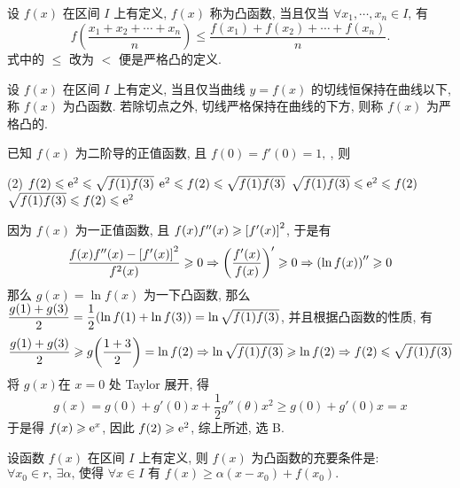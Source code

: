 \begin{definition}[凸函数 C]
    设 $ f(x) $ 在区间 $ I $ 上有定义, $f(x) $ 称为凸函数, 当且仅当 $ \forall x_{1}, \cdots, x_{n} \in   I$, 有
    $$f\left(\frac{x_{1}+x_{2}+\cdots+x_{n}}{n}\right) \leqslant \frac{f\left(x_{1}\right)+f\left(x_{2}\right)+\cdots+f\left(x_{n}\right)}{n} .$$
    式中的 $\leqslant$ 改为 $<$ 便是严格凸的定义.
\end{definition}

\begin{definition}[凸函数 D]
    设 $ f(x) $ 在区间 $ I $ 上有定义, 当且仅当曲线 $ y=f(x) $ 的切线恒保持在曲线以下, 称 $ f(x) $ 为凸函数. 若除切点之外, 切线严格保持在曲线的下方, 则称 $ f(x) $ 为严格凸的.
\end{definition}

\begin{example}
    已知 $f(x)$ 为二阶导的正值函数, 且 $f(0)=f'(0)=1,~$, 则
    \begin{tasks}(2)
        \task $f(2)\leqslant \mathrm{e}^{2}\leqslant \sqrt{f(1)f(3)}$
        \task $\mathrm{e}^{2}\leqslant f(2)\leqslant \sqrt{f(1)f(3)}$
        \task $\sqrt{f(1)f(3)}\leqslant \mathrm{e}^{2}\leqslant f(2)$
        \task $\sqrt{f(1)f(3)}\leqslant f(2)\leqslant \mathrm{e}^{2}$
    \end{tasks}
\end{example}
\begin{solution}
    因为 $f(x)$ 为一正值函数, 且 $f(x)f''(x)\geqslant \qty[f'(x)]^2$, 于是有 $$\dfrac{f(x)f''(x)-\qty[f'(x)]^2}{f^2(x)}\geqslant 0\Rightarrow \qty(\dfrac{f'(x)}{f(x)})'\geqslant 0\Rightarrow \qty(\ln f(x))''\geqslant 0$$
    那么 $g(x)=\ln f(x)$ 为一下凸函数, 那么 $\dfrac{g(1)+g(3)}{2}=\dfrac{1}{2}\qty(\ln f(1)+\ln f(3))=\ln\sqrt{f(1)f(3)}$, 并且根据凸函数的性质, 有 $$\dfrac{g(1)+g(3)}{2}\geqslant g\qty(\dfrac{1+3}{2})=\ln f(2)\Rightarrow \ln\sqrt{f(1)f(3)}\geqslant \ln f(2)\Rightarrow f(2)\leqslant \sqrt{f(1)f(3)}$$
    将 $g(x)$在 $x=0$ 处 Taylor 展开, 得 $$g(x)=g(0)+g'(0)x+\dfrac{1}{2}g''(\theta)x^2\geqslant g(0)+g'(0)x=x$$
    于是得 $f(x)\geqslant \mathrm{e}^x$, 因此 $f(2)\geqslant \mathrm{e}^2$, 综上所述, 选 B.
\end{solution}

\begin{theorem}
    设函数 $ f(x) $ 在区间 $ I $ 上有定义, 则 $ f(x) $ 为凸函数的充要条件是: $ \forall x_{0} \in   r,~
        \exists  \alpha \text{, 使得 } \forall x \in I  \text{ 有 }  f(x) \geqslant \alpha\left(x-x_{0}\right)+f\left(x_{0}\right) .$
\end{theorem}


